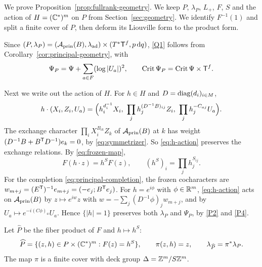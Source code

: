 \documentclass[12pt, letter]{amsart}
\theoremstyle{definition}
\begin{document}
We prove Proposition~\ref{prop:fullrank-geometry}.
We keep $P$, $\lambda_P$, $L_+$, $F$, $S$ and the action of $H=(\mathbb{C}^*)^m$ on $P$ from Section~\ref{sec:geometry}.
We identify $F^{-1}(1)$ and split a finite cover of $P$, then deform its Liouville form to the product form.

Since $(P,\lambda_P)=(\mathcal{A}_{\mathrm{prin}}(B),\lambda_{\mathrm{ad}})\times(T^*\mathsf T^f,p\,\mathrm{d} q)$, \ref{Q1} follows from Corollary~\ref{cor:principal-geometry}, with
\begin{equation}\label{eq:PsiP}
 \Psi_P=\Psi+\sum_{a\in F}(\log|U_a|)^2,\qquad \operatorname{Crit}\Psi_P=\operatorname{Crit}\Psi\times\mathsf T^f .
\end{equation}

Next we write out the action of $H$.
For $h\in H$ and $D=\operatorname{diag}(d_i)_{i\in M}$,
\begin{equation}\label{eq:h-action}
 h\cdot(X_i,Z_i,U_a)=\Bigl(h_i^{d_i^{-1}}X_i,\ \prod_jh_j^{(D^{-1}B)_{ij}}Z_i,\ \prod_jh_j^{-C_{aj}}U_a\Bigr).
\end{equation}
The exchange character $\prod_iX_i^{B_{ik}}Z_k$ of $\mathcal{A}_{\mathrm{prin}}(B)$ at $k$ has weight $(D^{-1}B+B^{\mathsf T}D^{-1})e_k=0$, by \eqref{eq:symmetrizer}.
So \eqref{eq:h-action} preserves the exchange relations.
By \eqref{eq:frozen-map},
\[
 F(h\cdot z)=h^SF(z),\qquad (h^S)_i=\prod_jh_j^{S_{ij}} .
\]
For the completion \eqref{eq:principal-completion}, the frozen cocharacters are $w_{m+j}=(E^{\mathsf T})^{-1}e_{m+j}=(-e_j;B^{\mathsf T}e_j)$.
For $h=e^{i\phi}$ with $\phi\in\mathbb{R}^m$, \eqref{eq:h-action} acts on $\mathcal{A}_{\mathrm{prin}}(B)$ by $z\mapsto e^{iw}z$ with $w=-\sum_j(D^{-1}\phi)_jw_{m+j}$, and by $U_a\mapsto e^{-i(C\phi)_a}U_a$.
Hence $\{|h|=1\}$ preserves both $\lambda_P$ and $\Psi_P$, by \ref{P2} and \ref{P4}.

Let $\widehat P$ be the fiber product of $F$ and $h\mapsto h^S$:
\[
 \widehat P=\{(z,h)\in P\times(\mathbb{C}^*)^m:F(z)=h^S\},\qquad \pi(z,h)=z,\qquad \lambda_{\widehat P}=\pi^*\lambda_P .
\]
The map $\pi$ is a finite cover with deck group $\Delta=\mathbb{Z}^m/S\mathbb{Z}^m$.
\end{document}
